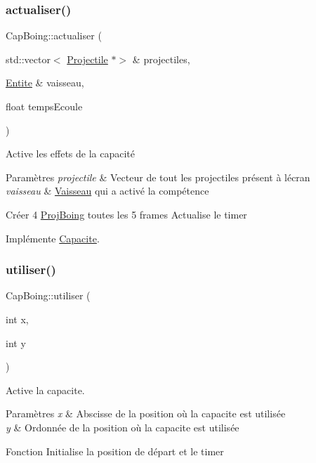 \subsubsection{\texorpdfstring{actualiser()}{actualiser()}}
{\footnotesize\ttfamily Cap\+Boing\+::actualiser (\begin{DoxyParamCaption}\item[{std\+::vector$<$ \hyperlink{class_projectile}{Projectile} $\ast$$>$ \&}]{projectiles,  }\item[{\hyperlink{class_entite}{Entite} \&}]{vaisseau,  }\item[{float}]{temps\+Ecoule }\end{DoxyParamCaption})\hspace{0.3cm}{\ttfamily [virtual]}}



Active les effets de la capacité 


\begin{DoxyParams}{Paramètres}
{\em projectile} & Vecteur de tout les projectiles présent à l\textquotesingle{}écran \\
\hline
{\em vaisseau} & \hyperlink{class_vaisseau}{Vaisseau} qui a activé la compétence\\
\hline
\end{DoxyParams}
Créer 4 \hyperlink{class_proj_boing}{Proj\+Boing} toutes les 5 frames Actualise le timer 

Implémente \hyperlink{class_capacite_a75c9621d7a704fedb10ad29c6a697d64}{Capacite}.

\mbox{\label{class_cap_boing_af68b4064c3a6dafd10adbd63c2f27547}} 
\subsubsection{\texorpdfstring{utiliser()}{utiliser()}}
{\footnotesize\ttfamily Cap\+Boing\+::utiliser (\begin{DoxyParamCaption}\item[{int}]{x,  }\item[{int}]{y }\end{DoxyParamCaption})\hspace{0.3cm}{\ttfamily [virtual]}}



Active la capacite. 


\begin{DoxyParams}{Paramètres}
{\em x} & Abscisse de la position où la capacite est utilisée \\
\hline
{\em y} & Ordonnée de la position où la capacite est utilisée\\
\hline
\end{DoxyParams}
Fonction Initialise la position de départ et le timer 


